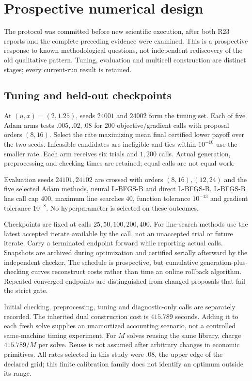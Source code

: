 \section{Prospective numerical design}\label{sec:r24design}
The protocol was committed before new scientific execution, after both R23 reports and the complete preceding evidence were examined. This is a prospective response to known methodological questions, not independent rediscovery of the old qualitative pattern. Tuning, evaluation and multicell construction are distinct stages; every current-run result is retained.

\subsection{Tuning and held-out checkpoints}
At $(u,x)=(2,1.25)$, seeds $24001$ and $24002$ form the tuning set. Each of five Adam arms tests $.005,.02,.08$ for $200$ objective/gradient calls with proposal orders $(8,16)$. Select the rate maximizing mean final certified lower payoff over the two seeds. Infeasible candidates are ineligible and ties within $10^{-10}$ use the smaller rate. Each arm receives six trials and $1,200$ calls. Actual generation, preprocessing and checking times are retained; equal calls are not equal work.

Evaluation seeds $24101,24102$ are crossed with orders $(8,16),(12,24)$ and the five selected Adam methods, neural L-BFGS-B and direct L-BFGS-B. L-BFGS-B has call cap $400$, maximum line searches $40$, function tolerance $10^{-13}$ and gradient tolerance $10^{-8}$. No hyperparameter is selected on these outcomes.

Checkpoints are fixed at calls $25,50,100,200,400$. For line-search methods use the latest accepted iterate available by the call, not an unaccepted trial or future iterate. Carry a terminated endpoint forward while reporting actual calls. Snapshots are archived during optimization and certified serially afterward by the independent checker. The schedule is prospective, but cumulative generation-plus-checking curves reconstruct costs rather than time an online rollback algorithm. Repeated converged endpoints are distinguished from changed proposals that fail the strict gate.

Initial checking, preprocessing, tuning and diagnostic-only calls are separately recorded. The inherited dual construction cost is $415.789$ seconds. Adding it to each fresh solve supplies an unamortized accounting scenario, not a controlled same-machine timing experiment. For $M$ solves reusing the same library, charge $415.789/M$ per solve. Reuse is not assumed after arbitrary changes in economic primitives. All rates selected in this study were $.08$, the upper edge of the declared grid; this finite calibration family does not identify an optimum outside its range.

